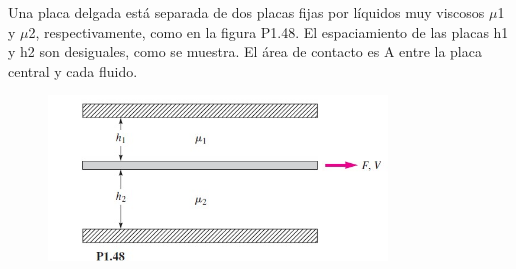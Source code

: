 \documentclass[12pt, a4paper]{exam}
\begin{document}
\begin{questions}
 
 
	\question Una placa delgada está separada de dos placas fijas por líquidos muy viscosos $\mu$1 y $\mu$2, respectivamente, como en la figura P1.48. El espaciamiento de las placas h1 y h2 son desiguales, como se muestra. El área de contacto es A entre la placa central y cada fluido.
    \begin{figure}[h]
    \includegraphics[width=9cm]{1.48 .jpg}
    \centering
    \end{figure}		



 
 

\end{questions}
\end{document}
